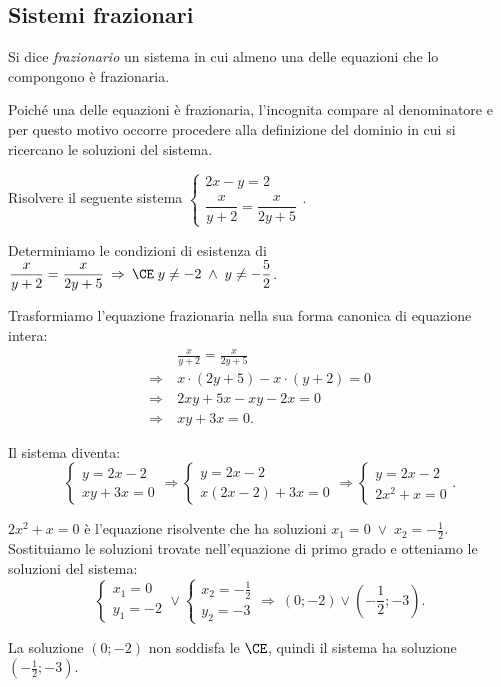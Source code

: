 \subsection{Sistemi frazionari}

\begin{definizione}
Si dice \emph{frazionario} un sistema in cui almeno una delle equazioni che lo compongono è frazionaria.
\end{definizione}

Poiché una delle equazioni è frazionaria, l'incognita compare al denominatore e per questo motivo occorre procedere alla definizione del dominio in cui si ricercano le soluzioni del sistema.

\begin{exrig}
\begin{esempio}
Risolvere il seguente sistema $\left\{\begin{array}{l}2x-y=2 \\\dfrac x{y+2}=\dfrac x{2y+5}\end{array}\right.$.

Determiniamo le condizioni di esistenza di $ \dfrac x{y+2}=\dfrac x{2y+5} \:\Rightarrow\:\CE\; y\neq -2\;\wedge\; y\neq -\dfrac 5 2$.

Trasformiamo l'equazione frazionaria nella sua forma canonica di equazione intera:
\begin{align*}
 &\frac x{y+2}=\frac x{2y+5}\\
\Rightarrow\: & x\cdot (2y+5)-x\cdot (y+2)=0\\
\Rightarrow\: & 2{xy}+5x-{xy}-2x=0\\
\Rightarrow\: & xy+3x=0.
\end{align*}

Il sistema diventa: 
\[\left\{\begin{array}{l}y=2x-2\\
xy+3x=0\end{array}\right.
\Rightarrow \left\{\begin{array}{l}y=2x-2\\
x(2x-2)+3x=0\end{array}\right.
\Rightarrow \left\{\begin{array}{l}y=2x-2\\
2x^2+x=0\end{array}\right..\]

$2x^2+x=0$ è l'equazione risolvente che ha soluzioni $x_1=0\;\vee\; x_2=-\frac 1 2$.
Sostituiamo le soluzioni trovate nell'equazione di primo grado e otteniamo le soluzioni del sistema: 
\[\left\{\begin{array}{l}x_1=0 \\
y_1=-2\end{array}\right.\vee 
\left\{\begin{array}{l}x_2=-\frac 1 2\\
y_2=-3\end{array}\right. 
\Rightarrow\:\left(0;-2\right)\vee \left(-\frac 1 2;-3\right).\]

La soluzione $(0;-2)$ non soddisfa le $\CE$, quindi il sistema ha soluzione $\left(-\frac 1 2;-3\right)$.
\end{esempio}
\end{exrig}
\ovalbox{\risolvii \ref{ese:6.10}, \ref{ese:6.11}}

